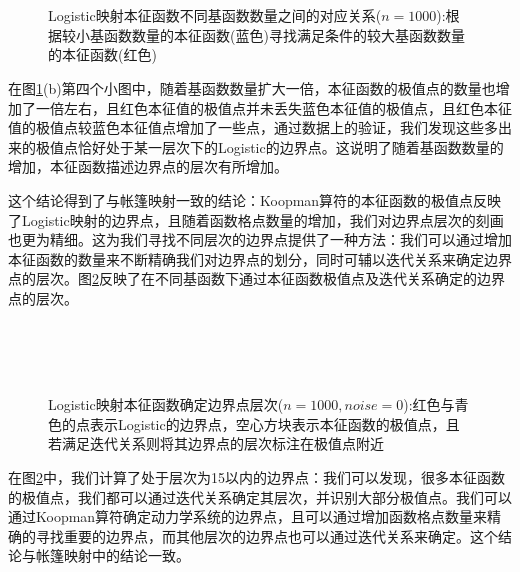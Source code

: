 \begin{figure}[!]
  \centering
    \\
    \\
  \caption[Logistic映射本征函数不同基函数数量之间的对应关系]{Logistic映射本征函数不同基函数数量之间的对应关系($n=1000$):根据较小基函数数量的本征函数(蓝色)寻找满足条件的较大基函数数量的本征函数(红色)}\label{fig:Logistic_findeigen_m8m16}
\end{figure}

在图\ref{fig:Logistic_findeigen_m8m16}(b)第四个小图中，随着基函数数量扩大一倍，本征函数的极值点的数量也增加了一倍左右，且红色本征值的极值点并未丢失蓝色本征值的极值点，且红色本征值的极值点较蓝色本征值点增加了一些点，通过数据上的验证，我们发现这些多出来的极值点恰好处于某一层次下的Logistic的边界点。这说明了随着基函数数量的增加，本征函数描述边界点的层次有所增加。

这个结论得到了与帐篷映射一致的结论：Koopman算符的本征函数的极值点反映了Logistic映射的边界点，且随着函数格点数量的增加，我们对边界点层次的刻画也更为精细。这为我们寻找不同层次的边界点提供了一种方法：我们可以通过增加本征函数的数量来不断精确我们对边界点的划分，同时可辅以迭代关系来确定边界点的层次。图\ref{fig:Logistic_auto_level_n1000_m4}反映了在不同基函数下通过本征函数极值点及迭代关系确定的边界点的层次。

\begin{figure}[!]
  \centering
    \\
    \\
    \\
  \caption[Logistic映射本征函数确定边界点层次]{Logistic映射本征函数确定边界点层次($n=1000,noise=0$):红色与青色的点表示Logistic的边界点，空心方块表示本征函数的极值点，且若满足迭代关系则将其边界点的层次标注在极值点附近}\label{fig:Logistic_auto_level_n1000_m4}
\end{figure}
在图\ref{fig:Logistic_auto_level_n1000_m4}中，我们计算了处于层次为15以内的边界点：我们可以发现，很多本征函数的极值点，我们都可以通过迭代关系确定其层次，并识别大部分极值点。我们可以通过Koopman算符确定动力学系统的边界点，且可以通过增加函数格点数量来精确的寻找重要的边界点，而其他层次的边界点也可以通过迭代关系来确定。这个结论与帐篷映射中的结论一致。



